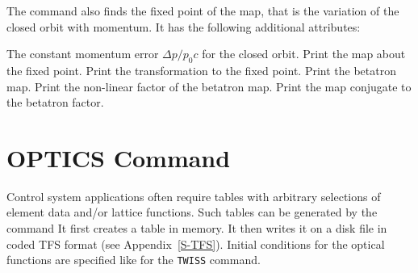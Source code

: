 The  command also finds the fixed point of the map,
that is the variation of the closed orbit with momentum.
It has the following additional attributes:
\begin{mylist}
The constant momentum error \(\Delta p/p_0 c\) for the closed orbit.
Print the map about the fixed point.
Print the transformation to the fixed point.
Print the betatron map.
Print the non-linear factor of the betatron map.
Print the map conjugate to the betatron factor.
\end{mylist}
 
\section{OPTICS Command}
\label{S-OPTICS}
Control system applications often require tables with
arbitrary selections of element data and/or lattice functions.
Such tables can be generated by the command
It first creates a table in memory.
It then writes it on a disk file in coded TFS format
(see Appendix~\ref{S-TFS}).
Initial conditions for the optical functions are specified like
for the {\tt TWISS} command.

